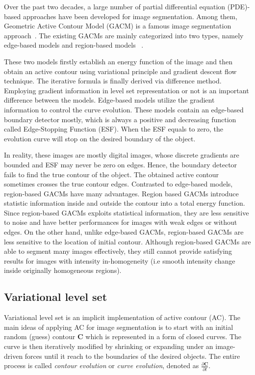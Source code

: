 \documentclass{WitsPhysicsReport}
\begin{document}
Over the past two decades, a large number of partial differential equation (PDE)-based approaches have been developed for image segmentation. Among them, Geometric Active Contour Model (GACM) is a famous image segmentation approach~\cite{chen2013fast,zhang2010active,truc2011homogeneity,ali2018segmentation,chan2001active,chen2011noisy}. The existing GACMs are mainly categorized into two types, namely edge-based models and region-based models~\cite{caselles1993geometric,caselles1997geodesic,paragios2001gradient} . 

These two models firstly establish an energy function of the image and then obtain an active contour using variational principle and gradient descent flow technique. The iterative formula is finally derived via difference method. Employing gradient information in level set representation or not is an important difference between the models. Edge-based models utilize the gradient information to control the curve evolution. These models contain an edge-based boundary detector mostly, which is always a positive and decreasing function called Edge-Stopping Function (ESF). When the ESF equals to zero, the evolution curve will stop on the desired boundary of the object.

In reality, these images are mostly digital images, whose discrete gradients are bounded and ESF may never be zero on edges. Hence, the boundary detector fails to find the true contour of the object. The obtained active contour sometimes crosses the true contour edges. Contrasted to edge-based models, region-based GACMs have many advantages. Region based GACMs introduce statistic information inside and outside the contour into a total energy function. Since region-based GACMs exploits  statistical information, they are less sensitive to noise and have better performances for images with weak edges or without edges. On the other hand, unlike edge-based GACMs, region-based GACMs are less sensitive to the location of initial contour. Although region-based GACMs are able to segment many images effectively, they still cannot provide satisfying results for images with intensity in-homogeneity (i.e smooth intensity change inside originally homogeneous regions).  





\subsection{Variational level set}
Variational level set is an implicit implementation of active contour (AC). The main ideas of applying AC for image segmentation is to start with an initial random (guess) contour $\mathbf{C}$ which is represented in a form of closed curves. The curve is then iteratively modified by shrinking or expanding under an image-driven forces until it reach to the boundaries of the desired objects. The entire process is called \textit{contour evolution} or \textit{curve evolution}, denoted as $\frac{\partial \mathbf{C} }{\partial t}$.
\end{document}

